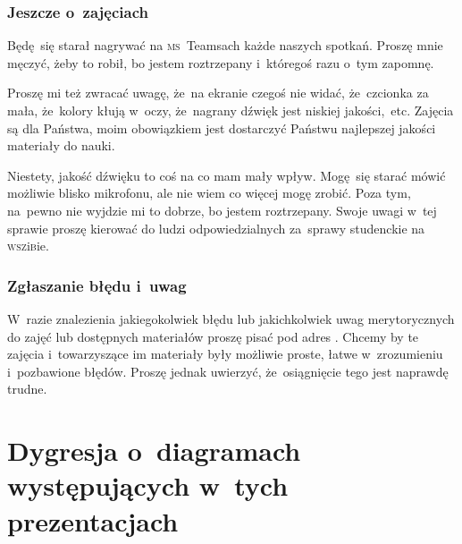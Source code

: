 \documentclass[10pt,t]{beamer}
\begin{document}
\begin{frame}
  \frametitle{Jeszcze o~zajęciach}


  Będę~się starał nagrywać na \textsc{ms}~Teamsach każde naszych spotkań.
  Proszę mnie męczyć, żeby to robił, bo jestem roztrzepany i~któregoś
  razu o~tym zapomnę.

  Proszę mi też zwracać uwagę, że~na ekranie czegoś nie widać,
  że~czcionka za mała, że~kolory kłują w~oczy, że~nagrany dźwięk
  jest niskiej jakości,~etc. Zajęcia są dla Państwa, moim obowiązkiem jest
  dostarczyć Państwu najlepszej jakości materiały do nauki.

  Niestety, jakość dźwięku to coś na co mam mały wpływ. Mogę~się starać
  mówić możliwie blisko mikrofonu, ale nie wiem co więcej mogę zrobić.
  Poza tym, na~pewno nie wyjdzie mi to dobrze, bo jestem roztrzepany.
  Swoje uwagi w~tej sprawie proszę kierować do ludzi odpowiedzialnych
  za~sprawy studenckie na \textsc{wsz}i\textsc{b}ie.

\end{frame}





\begin{frame}
  \frametitle{Zgłaszanie błędu i~uwag}


  W~razie znalezienia jakiegokolwiek błędu lub jakichkolwiek uwag
  merytorycznych do zajęć lub dostępnych materiałów proszę pisać pod adres
  \email. Chcemy by te zajęcia i~towarzyszące im materiały były możliwie
  proste, łatwe w~zrozumieniu i~pozbawione błędów. Proszę jednak uwierzyć,
  że~osiągnięcie tego jest naprawdę trudne.

\end{frame}










\section{Dygresja o~diagramach występujących w~tych
  prezentacjach}
\end{document}
